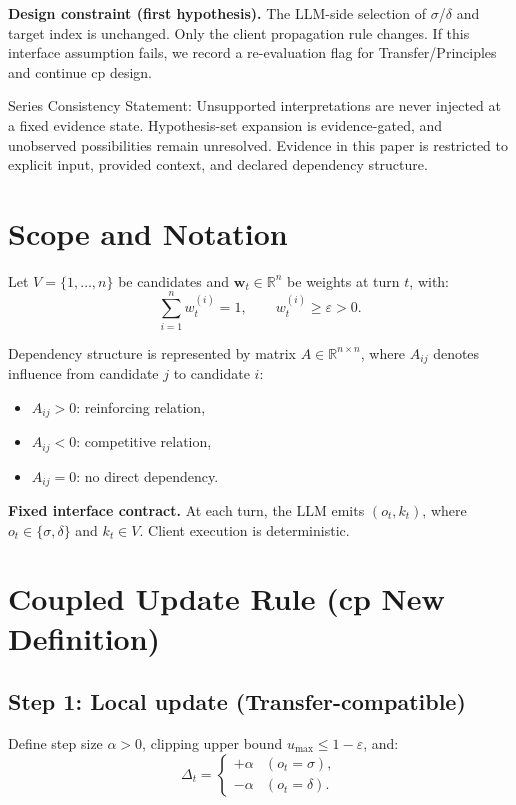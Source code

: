 \documentclass[11pt,a4paper]{article}
\begin{document}
\textbf{Design constraint (first hypothesis).}
The LLM-side selection of \(\sigma\)/\(\delta\) and target index is unchanged. Only the client propagation rule changes. If this interface assumption fails, we record a re-evaluation flag for Transfer/Principles and continue cp design.

Series Consistency Statement: Unsupported interpretations are never injected at a fixed evidence state. Hypothesis-set expansion is evidence-gated, and unobserved possibilities remain unresolved. Evidence in this paper is restricted to explicit input, provided context, and declared dependency structure.

\section{Scope and Notation}
Let \(V=\{1,\dots,n\}\) be candidates and \(\mathbf{w}_t\in\mathbb{R}^n\) be weights at turn \(t\), with:
\[
\sum_{i=1}^n w_t^{(i)} = 1,\qquad w_t^{(i)}\ge \varepsilon > 0.
\]

Dependency structure is represented by matrix \(A\in\mathbb{R}^{n\times n}\), where \(A_{ij}\) denotes influence from candidate \(j\) to candidate \(i\):
\begin{itemize}
  \item \(A_{ij}>0\): reinforcing relation,
  \item \(A_{ij}<0\): competitive relation,
  \item \(A_{ij}=0\): no direct dependency.
\end{itemize}

\textbf{Fixed interface contract.}
At each turn, the LLM emits \((o_t,k_t)\), where \(o_t\in\{\sigma,\delta\}\) and \(k_t\in V\). Client execution is deterministic.

\section{Coupled Update Rule (cp New Definition)}
\subsection{Step 1: Local update (Transfer-compatible)}
Define step size \(\alpha>0\), clipping upper bound \(u_{\max}\le 1-\varepsilon\), and:
\[
\Delta_t = \begin{cases}
+\alpha & (o_t=\sigma),\\
-\alpha & (o_t=\delta).
\end{cases}
\]
\end{document}
